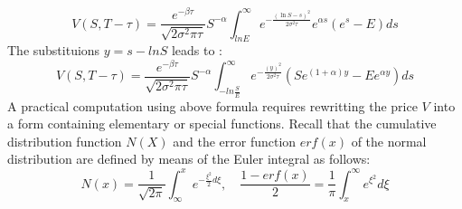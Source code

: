 \documentclass[a4paper]{article}
\begin{document}
\begin{itemize}
    \begin{equation}
        V(S, T-\tau)=\frac{e^{-\beta \tau}}{\sqrt{2 \sigma^{2} \pi \tau}} S^{-\alpha} \int_{ln E}^{\infty} e^{-\frac{(\ln S-s)^{2}}{2 \sigma^{2} \tau}} e^{\alpha s} \left(e^{s}- E\right) d s
    \end{equation}
The substituions $y=s-lnS$ leads to :
    \begin{equation}
        V(S, T-\tau)=\frac{e^{-\beta \tau}}{\sqrt{2 \sigma^{2} \pi \tau}} S^{-\alpha} \int_{-ln \frac{S}{E}}^{\infty} e^{-\frac{(y)^{2}}{2 \sigma^{2} \tau}}  \left(Se^{(1+\alpha)y}- E e^{\alpha y}\right) d s
    \end{equation}
A practical computation using above formula requires rewritting the price $V$ into a form containing elementary or special functions. Recall that the cumulative distribution function $N(X)$ 
and the error function $erf(x)$ of the normal distribution are defined by means of the Euler integral as follows:
\begin{equation}
    N(x) = \frac{1}{\sqrt{2 \pi}} \int_{\infty}^{x} e^{-\frac{\xi^2}{2}d\xi}, \quad \frac{1-erf(x)}{2} = \frac{1}{\pi} \int_{x}^{\infty} e^{\xi^2} d\xi
\end{equation}
\end{itemize}
\end{document}
